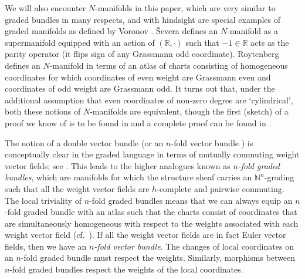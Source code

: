 \documentclass[pdftex]{sigma}
\numberwithin{equation}{section}
\begin{document}
\begin{Remark}
We will also encounter $N$-manifolds in this paper, which are very similar to graded bundles in many respects, and with hindsight are special examples of graded manifolds as def\/ined by Voronov \cite{Voronov:2001qf}. \v{S}evera \cite{Severa:2005} def\/ines an $N$-manifold as a supermanifold equipped with an action of $(\mathbb{R}, \cdot)$ such that $-1 \in \mathbb{R}$ acts as the parity operator (it f\/lips sign of any Grassmann odd coordinate). Roytenberg \cite{Roytenberg:2002} def\/ines an $N$-manifold in terms of an atlas of charts consisting of homogeneous coordinates for which coordinates of even weight are Grassmann even and coordinates of odd weight are Grassmann odd. It turns out that, under the additional assumption that even coordinates of non-zero degree are `cylindrical', both these notions of $N$-manifolds are equivalent, though the f\/irst (sketch) of a proof we know of is to be found in \cite{Bruce:2014c} and a complete proof can be found in \cite{Jozwikowski:2016}.
\end{Remark}

The notion of a double vector bundle \cite{Pradines:1974} (or an $n$-fold vector bundle \cite{Gracia-Saz:2009,Gracia-Saz:2012,Mackenzie:2005,Voronov:2012}) is conceptually clear in the graded language in terms of mutually commuting weight vector f\/ields; see \cite{Grabowski:2006,JG_MR_higher_vb}. This leads to the higher analogues known as \emph{$n$-fold graded bundles}, which are manifolds for which the structure sheaf carries an $\mathbb{N}^{n}$-grading such that all the weight vector f\/ields are $h$-complete and pairwise commuting. The local triviality of $n$-fold graded bundles means that we can always equip an $n$-fold graded bundle with an atlas such that the charts consist of coordinates that are simultaneously homogeneous with respect to the weights associated with each weight vector f\/ield (cf.~\cite{JG_MR_higher_vb}). If all the weight vector f\/ields are in fact Euler vector f\/ields, then we have an \emph{$n$-fold vector bundle}. The changes of local coordinates on an $n$-fold graded bundle must respect the weights. Similarly, morphisms between $n$-fold graded bundles respect the weights of the local coordinates.
\end{document}
